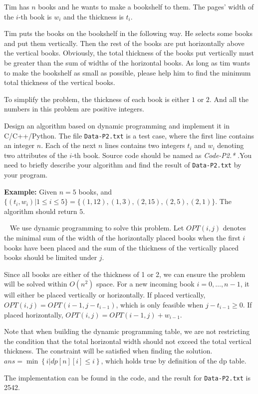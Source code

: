 \begin{exercise}[Bookshelf]{Tim has $n$ books and he wants to make a bookshelf to them. The pages' width of the $i$-th book is $w_i$ and the thickness is $t_i$. 

    Tim puts the books on the bookshelf in the following way. He selects some books and put them vertically. Then the rest of the books are put horizontally above the vertical books. Obviously, the total thickness of the books put vertically must be greater than the sum of widths of the horizontal books. As long as tim wants to make the bookshelf as small as possible, please help him to find the minimum total thickness of the vertical books.

    To simplify the problem, the thickness of each book is either $1$ or $2$. And all the numbers in this problem are positive integers.

    Design an algorithm based on dynamic programming and implement it in C/C++/Python. The file \texttt{Data-P2.txt} is a test case, where the first line contains an integer $n$. Each of the next $n$ lines contains two integers $t_i$ and $w_i$ denoting two attributes of the $i$-th book. Source code should be named as
    {\color{red}\emph{Code-P2.*}} .You need to briefly describe your algorithm and find the result of \texttt{Data-P2.txt} by your program.

    \textbf{Example:} Given $n=5$ books, and $\{(t_i,w_i)|1\leq i \leq 5\} = \{(1,12),(1,3),(2,15),(2,5),(2,1)\}$. The algorithm should return $5$.
}
  \begin{solution}
  \par{~}
  We use dynamic programming to solve this problem. Let $OPT(i,j)$ denotes the minimal sum of the width of the horizontally placed books when the first $i$ books have been placed and the sum of the thickness of the vertically placed books should be limited under $j$.

  Since all books are either of the thickness of 1 or 2, we can ensure the problem will be solved within $O(n^2)$ space. For a new incoming book $i=0,\ldots,n-1$, it will either be placed vertically or horizontally. If placed vertically, $OPT(i,j) =OPT(i-1,j-t_{i-1})$, which is only feasible when $j - t_{i-1} \ge 0$. If placed horizontally, $OPT(i,j) = OPT(i-1,j) + w_{i-1}$.
  
  Note that when building the dynamic programming table, we are not restricting the condition that the total horizontal width should not exceed the total vertical thickness. The constraint will be satisfied when finding the solution. $ans = \min \left\{i | dp[n][i] \le i \right\}$, which holds true by definition of the dp table.

  The implementation can be found in the code, and the result for \texttt{Data-P2.txt} is 2542.

  \end{solution}
  \label{ex2}
\end{exercise}


